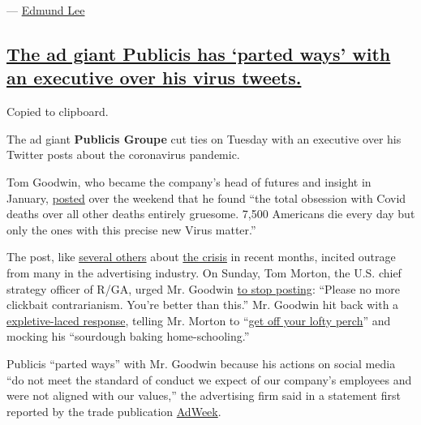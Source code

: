 --- \href{https://www.nytimes.com/by/edmund-lee}{Edmund Lee}

\hypertarget{the-ad-giant-publicis-has-parted-ways-with-an-executive-over-his-virus-tweets}{%
\subsection{\texorpdfstring{\protect\hyperlink{the-ad-giant-publicis-has-parted-ways-with-an-executive-over-his-virus-tweets}{The
ad giant Publicis has `parted ways' with an executive over his virus
tweets.}}{The ad giant Publicis has `parted ways' with an executive over his virus tweets.}}\label{the-ad-giant-publicis-has-parted-ways-with-an-executive-over-his-virus-tweets}}

Copied to clipboard.

The ad giant \textbf{Publicis Groupe} cut ties on Tuesday with an
executive over his Twitter posts about the coronavirus pandemic.

Tom Goodwin, who became the company's head of futures and insight in
January,
\href{https://twitter.com/tomfgoodwin/status/1289981216335073280?s=20}{posted}
over the weekend that he found ``the total obsession with Covid deaths
over all other deaths entirely gruesome. 7,500 Americans die every day
but only the ones with this precise new Virus matter.''

The post, like
\href{https://twitter.com/tomfgoodwin/status/1251848439035502592?s=20}{several
others} about
\href{https://twitter.com/tomfgoodwin/status/1236483014277894144?s=20}{the
crisis} in recent months, incited outrage from many in the advertising
industry. On Sunday, Tom Morton, the U.S. chief strategy officer of
R/GA, urged Mr. Goodwin
\href{https://twitter.com/tommorton/status/1289992807038332928?s=20}{to
stop posting}: ``Please no more clickbait contrarianism. You're better
than this.'' Mr. Goodwin hit back with a
\href{https://twitter.com/tomfgoodwin/status/1289995369313497090?s=20}{expletive-laced
response}, telling Mr. Morton to
``\href{https://twitter.com/tomfgoodwin/status/1289994688275988481?s=20}{get
off your lofty perch}'' and mocking his ``sourdough baking
home-schooling.''

Publicis ``parted ways'' with Mr. Goodwin because his actions on social
media ``do not meet the standard of conduct we expect of our company's
employees and were not aligned with our values,'' the advertising firm
said in a statement first reported by the trade publication
\href{https://www.adweek.com/agencies/after-coronavirus-tweets-tom-goodwin-is-out-at-publicis-groupe/}{AdWeek}.

